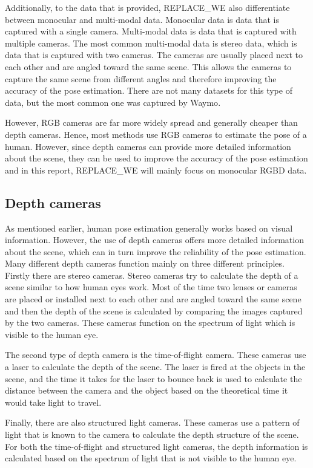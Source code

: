 Additionally, to the data that is provided, REPLACE_WE also differentiate between monocular and multi-modal data. Monocular data is data that is captured with a single camera. Multi-modal data is data that is captured with multiple cameras. The most common multi-modal data is stereo data, which is data that is captured with two cameras. The cameras are usually placed next to each other and are angled toward the same scene. This allows the cameras to capture the same scene from different angles and therefore improving the accuracy of the pose estimation. There are not many datasets for this type of data, but the most common one was captured by Waymo\cite{Waymo}.

However, RGB cameras are far more widely spread and generally cheaper than depth cameras. Hence, most methods use RGB cameras to estimate the pose of a human. However, since depth cameras can provide more detailed information about the scene, they can be used to improve the accuracy of the pose estimation and in this report, REPLACE_WE will mainly focus on monocular RGBD data.

\subsection{Depth cameras}

As mentioned earlier, human pose estimation generally works based on visual information. However, the use of depth cameras offers more detailed information about the scene, which can in turn improve the reliability of the pose estimation. Many different depth cameras function mainly on three different principles. Firstly there are stereo cameras. Stereo cameras try to calculate the depth of a scene similar to how human eyes work. Most of the time two lenses or cameras are placed or installed next to each other and are angled toward the same scene and then the depth of the scene is calculated by comparing the images captured by the two cameras. These cameras function on the spectrum of light which is visible to the human eye. 

The second type of depth camera is the time-of-flight camera. These cameras use a laser to calculate the depth of the scene. The laser is fired at the objects in the scene, and the time it takes for the laser to bounce back is used to calculate the distance between the camera and the object based on the theoretical time it would take light to travel. 

Finally, there are also structured light cameras. These cameras use a pattern of light that is known to the camera to calculate the depth structure of the scene. For both the time-of-flight and structured light cameras, the depth information is calculated based on the spectrum of light that is not visible to the human eye.

